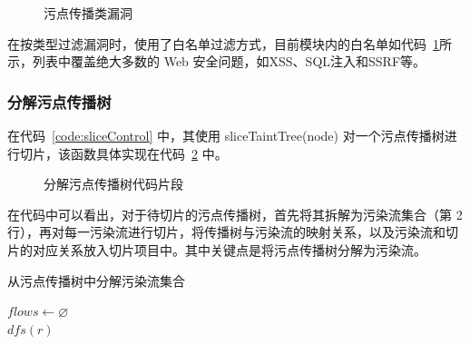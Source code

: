 \begin{figure}[!htbp]
    \centering
    \begin{minipage}[!htbp]{0.9\textwidth}
        
    \end{minipage}
    \caption{污点传播类漏洞}\label{code:caredVulns}
\end{figure}

在按类型过滤漏洞时，使用了白名单过滤方式，目前模块内的白名单如代码~\ref{code:caredVulns}所示，列表中覆盖绝大多数的 Web 安全问题，如XSS、SQL注入和SSRF等。

\subsubsection{分解污点传播树}

在代码~\ref{code:sliceControl} 中，其使用 sliceTaintTree(node) 对一个污点传播树进行切片，该函数具体实现在代码~\ref{code:sliceTree} 中。

 \begin{figure}[!htbp]
     \centering
     \begin{minipage}[!htbp]{0.9\textwidth}
         
     \end{minipage}
     \caption{分解污点传播树代码片段}\label{code:sliceTree}
 \end{figure}
 
 在代码中可以看出，对于待切片的污点传播树，首先将其拆解为污染流集合（第 2 行），再对每一污染流进行切片，将传播树与污染流的映射关系，以及污染流和切片的对应关系放入切片项目中。其中关键点是将污点传播树分解为污染流。
 
 \begin{algorithm}[!htb]\footnotesize
     \caption{从污点传播树中分解污染流集合}
     \label{alg:getTaintFlows}
     $flows \leftarrow \varnothing$\\
     $dfs(r)$\\
 \end{algorithm}

